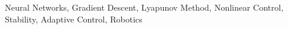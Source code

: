 \begin{abstract}
    \hl{...}
    \newline
\end{abstract}

\begin{IEEEkeywords}
    Neural Networks, Gradient Descent, Lyapunov Method, Nonlinear Control, Stability, Adaptive Control, Robotics
\end{IEEEkeywords}